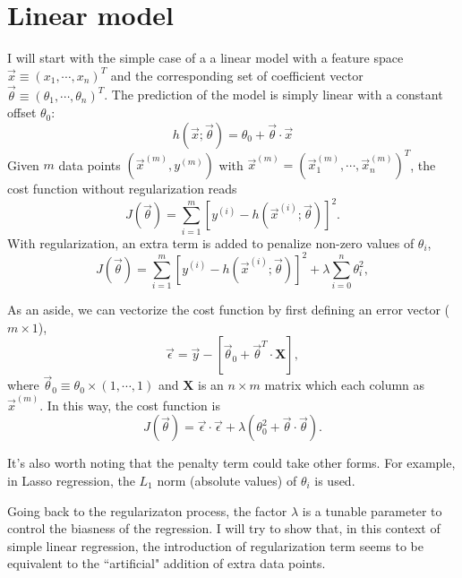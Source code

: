 \section{Linear model}
I will start with the simple case of a a linear model with a feature space $\vec x \equiv(x_1, \cdots, x_n)^T$ and the corresponding set of coefficient 
vector $\vec\theta\equiv(\theta_1, \cdots, \theta_n)^T$. The prediction of the model is simply linear with a constant offset $\theta_0$:
\begin{equation}
h(\vec x;\vec\theta) = \theta_0 + \vec\theta\cdot\vec x
\end{equation}
Given $m$ data points $(\vec x^{(m)}, y^{(m)})$ with $\vec x^{(m)} = (\vec x_1^{(m)}, \cdots, \vec x_n^{(m)})^T$, the cost function without regularization reads
\begin{equation}
J(\vec\theta) = \sum_{i=1}^{m}\left[y^{(i)}-h(\vec x^{(i)};\vec\theta)\right]^2.
\end{equation}
With regularization, an extra term is added to penalize non-zero values of $\theta_i$,
\begin{equation}
J(\vec\theta) = \sum_{i=1}^{m}\left[y^{(i)}-h(\vec x^{(i)};\vec\theta)\right]^2 + \lambda\sum_{i=0}^{n}\theta_i^2,
\end{equation}

As an aside, we can vectorize the cost function by first defining an error vector ($m\times1$),
\begin{equation}
\vec\epsilon = \vec y - \left[\vec\theta_0+\vec\theta^T\cdot\mathbf{X}\right],
\end{equation}
where $\vec\theta_0\equiv\theta_0\times(1, \cdots, 1)$ and $\mathbf{X}$ is an $n\times m$ matrix which each column as $\vec x^{(m)}$. In this way, the cost function
is
\begin{equation}
J(\vec\theta) = \vec\epsilon\cdot\vec\epsilon + \lambda(\theta_0^2+\vec\theta\cdot\vec\theta).
\end{equation}

It's also worth noting that the penalty term could take other forms. For example, in Lasso regression, the $L_1$ norm (absolute values) of $\theta_i$ is used.

Going back to the regularizaton process, the factor $\lambda$ is a tunable parameter to control the biasness of the regression. I will try to show that, in this
context of simple linear regression, the introduction of regularization term seems to be equivalent to the ``artificial" addition of extra data points.

